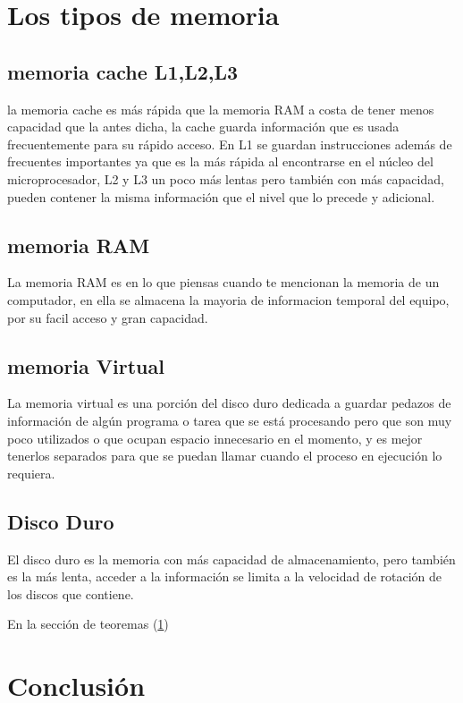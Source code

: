 \documentclass{article}
\begin{document}
 \vspace{0.4cm}

\section{Los tipos de memoria} \label{contenido}

\vspace{0.3cm}

\subsection{memoria cache L1,L2,L3}

la memoria cache es más rápida que la memoria RAM a costa de tener menos capacidad que la antes dicha, la cache guarda información que es usada frecuentemente para su rápido acceso. En L1 se guardan instrucciones además de frecuentes importantes ya que es la más rápida al encontrarse en el núcleo del microprocesador, L2 y L3 un poco más lentas pero también con más capacidad, pueden contener la misma información que el nivel que lo precede y adicional.

\vspace{0.3cm}

\subsection{memoria RAM}

La memoria RAM es en lo que piensas cuando te mencionan la memoria de un computador, en ella se almacena la mayoria de informacion temporal del equipo, por su facil acceso y gran capacidad.

\vspace{0.3cm}

\subsection{memoria Virtual}

La memoria virtual es una porción del disco duro dedicada a guardar pedazos de información de algún programa o tarea que se está procesando pero que son muy poco utilizados o que ocupan espacio innecesario en el momento, y es mejor tenerlos separados para que se puedan llamar cuando el proceso en ejecución lo requiera.

\vspace{0.3cm}

\subsection{Disco Duro}

El disco duro es la memoria con más capacidad de almacenamiento, pero también es la más lenta, acceder a la información se limita a la velocidad de rotación de los discos que contiene.



En la sección de teoremas (\ref{contenido})

\section{Conclusión} \label{conclulsion}



\end{document}
